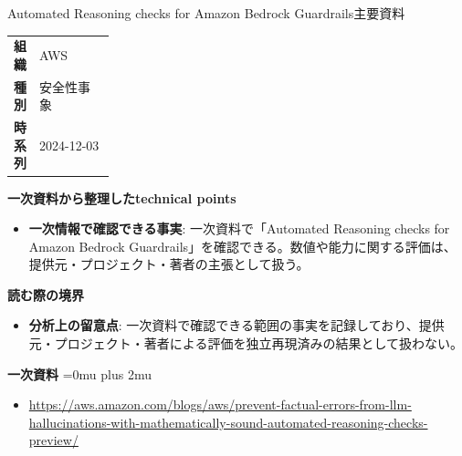 \begin{technicalnote}{Automated Reasoning checks for Amazon Bedrock Guardrails}{主要資料}
\begingroup
\begin{tabularx}{\linewidth}{@{}>{\bfseries}p{0.22\linewidth}X@{}}
組織 & AWS \\
種別 & 安全性事象 \\
時系列 & 2024-12-03 \\
\end{tabularx}
\smallskip
{\bfseries 一次資料から整理したtechnical points}
\begin{itemize}[leftmargin=1.5em,itemsep=0.35em]
\item \textbf{一次情報で確認できる事実}: 一次資料で「Automated Reasoning checks for Amazon Bedrock Guardrails」を確認できる。数値や能力に関する評価は、提供元・プロジェクト・著者の主張として扱う。
\end{itemize}
\begin{minipage}{\linewidth}
{\bfseries 読む際の境界}
\begin{itemize}[leftmargin=1.5em,itemsep=0.35em]
\item \textbf{分析上の留意点}: 一次資料で確認できる範囲の事実を記録しており、提供元・プロジェクト・著者による評価を独立再現済みの結果として扱わない。
\end{itemize}
\begin{samepage}
{\bfseries 一次資料}
\begingroup\sloppy
\Urlmuskip=0mu plus 2mu\relax
\begin{itemize}[leftmargin=1.5em,itemsep=0.25em]
\item {\scriptsize\url{https://aws.amazon.com/blogs/aws/prevent-factual-errors-from-llm-hallucinations-with-mathematically-sound-automated-reasoning-checks-preview/}}
\end{itemize}
\endgroup
\end{samepage}
\end{minipage}
\endgroup
\end{technicalnote}
\medskip

